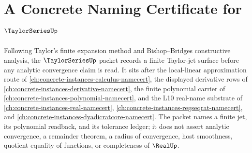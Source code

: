 \chapter{A Concrete Naming Certificate for $\TaylorSeriesUp$}
\label{ch:concrete-instances-taylor-series-namecert}

Following Taylor's finite expansion method and Bishop--Bridges constructive analysis, the $\TaylorSeriesUp$ packet records a finite Taylor-jet surface before any analytic convergence claim is read. It sits after the local-linear approximation route of \autoref{ch:concrete-instances-calculus-namecert}, the displayed derivative rows of \autoref{ch:concrete-instances-derivative-namecert}, the finite polynomial carrier of \autoref{ch:concrete-instances-polynomial-namecert}, and the L10 real-name substrate of \autoref{ch:concrete-instances-real-namecert}, \autoref{ch:concrete-instances-regseqrat-namecert}, and \autoref{ch:concrete-instances-dyadicratcore-namecert}. The packet names a finite jet, its polynomial readback, and its tolerance ledger; it does not assert analytic convergence, a remainder theorem, a radius of convergence, host smoothness, quotient equality of functions, or completeness of $\RealUp$.

